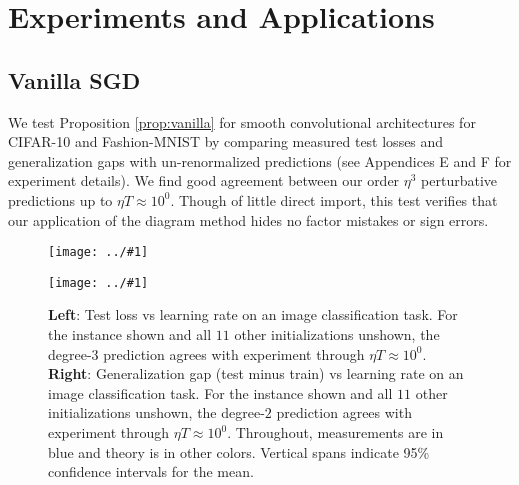 \documentclass{article}
\newcommand{\plotmoo}[3]{
    \texttt{[image: ../\#1]}
}
\begin{document}

\section{Experiments and Applications}


    \subsection{Vanilla SGD}
        We test Proposition \ref{prop:vanilla} for smooth convolutional
        architectures for CIFAR-10 and Fashion-MNIST by comparing measured 
        test losses and generalization gaps with un-renormalized predictions
        (see Appendices E and F for experiment details).  We find good
        agreement between our order $\eta^3$ perturbative predictions up to
        $\eta T \approx 10^0$.  Though of little direct import, this test
        verifies that our application of the diagram method hides no factor
        mistakes or sign errors.
        \begin{figure}[h!]
            \centering
            \plotmoo{plots/test-vanilla-fashion}{0.48\columnwidth}{3.0cm} 
            \plotmoo{plots/gen-cifar}{0.48\columnwidth}{3.0cm}
            \caption{
                {\bf Left}: Test loss vs learning rate on an image
                classification task.  For the instance shown and all $11$ other
                initializations unshown, the degree-$3$ prediction agrees with
                experiment through $\eta T \approx 10^0$.
                {\bf Right}:
                Generalization gap (test minus train) vs learning rate on an
                image classification task.  For the instance shown and all $11$
                other initializations unshown, the degree-$2$ prediction agrees
                with experiment through $\eta T \approx 10^0$.  Throughout,
                measurements are in blue and theory is in other colors.
                Vertical spans indicate 95\% confidence intervals for the mean.
            }
        \end{figure}
\end{document}
